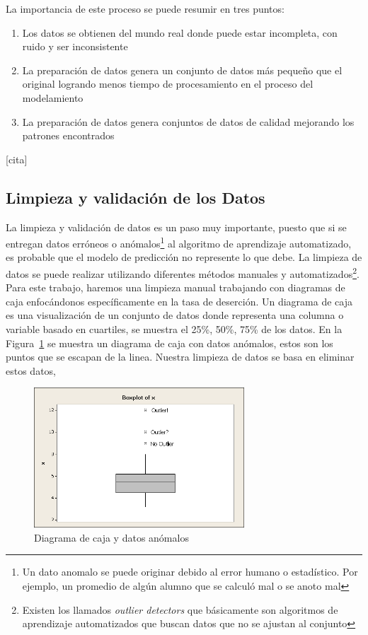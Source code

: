 La importancia de este proceso se puede resumir en tres puntos:
\begin{enumerate}
  \item Los datos se obtienen del mundo real donde puede estar incompleta, con ruido y ser inconsistente
  \item La preparación de datos genera un conjunto de datos más pequeño que el original logrando menos tiempo de procesamiento en el proceso del modelamiento
  \item La preparación de datos genera conjuntos de datos de calidad mejorando los patrones encontrados
\end{enumerate}
[cita]
\subsection{Limpieza y validación de los Datos}
La limpieza y validación de datos es un paso muy importante, puesto que si se entregan datos erróneos o anómalos\footnote{Un dato anomalo se puede originar debido al error humano o estadístico. Por ejemplo, un promedio de algún alumno que se calculó mal o se anoto mal } al algoritmo de aprendizaje automatizado, es probable que el modelo de predicción no represente lo que debe. La limpieza de datos se puede realizar utilizando diferentes métodos manuales y automatizados\footnote{Existen los llamados \textit{outlier detectors} que básicamente son algoritmos de aprendizaje automatizados que buscan datos que no se ajustan al conjunto}. Para este trabajo, haremos una limpieza manual trabajando con diagramas de caja enfocándonos específicamente en la tasa de deserción.
Un diagrama de caja es una visualización de un conjunto de datos donde representa una columna o variable basado en cuartiles, se muestra el 25\%, 50\%, 75\% de los datos.
En la Figura~\ref{fig:outlier} se muestra un diagrama de caja con datos anómalos, estos son los puntos que se escapan de la linea. Nuestra limpieza de datos se basa en eliminar estos datos,
\begin{figure}
  \centering
    \includegraphics[width=0.7\textwidth]{Figuras/outlier1}
      \caption{Diagrama de caja y datos anómalos}
    \label{fig:outlier}
\end{figure}
